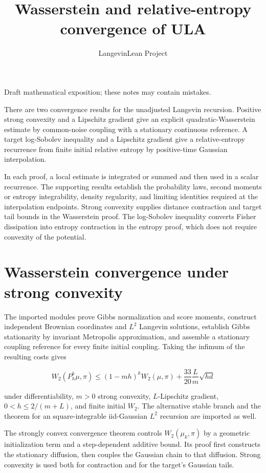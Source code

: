 \documentclass[11pt,a4paper]{article}
\title{\texorpdfstring{Wasserstein and relative-entropy convergence of ULA}{Wasserstein and relative-entropy convergence of ULA}}
\author{LangevinLean Project}
\date{}
\begin{document}
\maketitle
Draft mathematical exposition; these notes may contain mistakes.


There are two convergence results for the unadjusted Langevin recursion. Positive strong convexity and a Lipschitz gradient give an explicit quadratic-Wasserstein estimate by common-noise coupling with a stationary continuous reference. A target log-Sobolev inequality and a Lipschitz gradient give a relative-entropy recurrence from finite initial relative entropy by positive-time Gaussian interpolation.



In each proof, a local estimate is integrated or summed and then used in a scalar recurrence. The supporting results establish the probability laws, second moments or entropy integrability, density regularity, and limiting identities required at the interpolation endpoints. Strong convexity supplies distance contraction and target tail bounds in the Wasserstein proof. The log-Sobolev inequality converts Fisher dissipation into entropy contraction in the entropy proof, which does not require convexity of the potential.


\section{\texorpdfstring{Wasserstein convergence under strong convexity}{Wasserstein convergence under strong convexity}}


The imported modules prove Gibbs normalization and score moments, construct independent Brownian coordinates and \(L^2\) Langevin solutions, establish Gibbs stationarity by invariant Metropolis approximation, and assemble a stationary coupling reference for every finite initial coupling. Taking the infimum of the resulting costs gives

\[W_2(P_h^k\mu,\pi)\le(1-mh)^kW_2(\mu,\pi)+\frac{33}{20}\frac Lm\sqrt{hd}\]

under differentiability, \(m>0\) strong convexity, \(L\)-Lipschitz gradient, \(0<h\le2/(m+L)\), and finite initial \(W_2\). The alternative stable branch and the theorem for an square-integrable iid-Gaussian \(L^2\) recursion are imported as well.



The strongly convex convergence theorem controls \(W_2(\mu_k,\pi)\) by a geometric initialization term and a step-dependent additive bound. Its proof first constructs the stationary diffusion, then couples the Gaussian chain to that diffusion. Strong convexity is used both for contraction and for the target's Gaussian tails.
\end{document}
